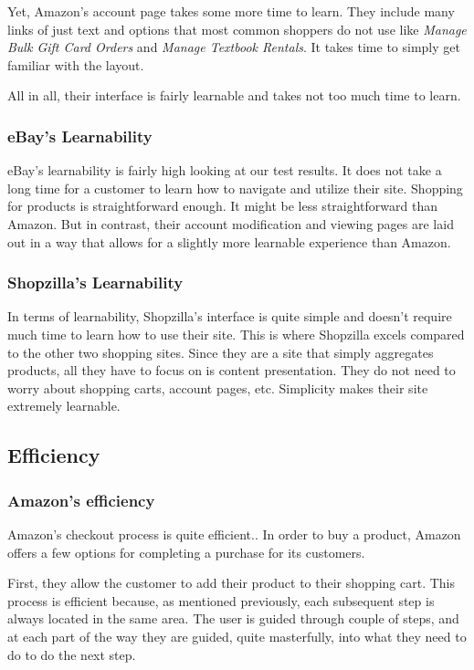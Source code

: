 \documentclass[11pt, oneside]{article}
\begin{document}
		Yet, Amazon's account page takes some more time to learn. They include many links of just text and options that most common shoppers do not use like \textit{Manage Bulk Gift Card Orders} and \textit{Manage Textbook Rentals}. It takes time to simply get familiar with the layout.

		All in all, their interface is fairly learnable and takes not too much time to learn.

		\subsubsection{eBay's Learnability}
		eBay's learnability is fairly high looking at our test results. It does not take a long time for a customer to learn how to navigate and utilize their site. Shopping for products is straightforward enough. It might be less straightforward than Amazon. But in contrast, their account modification and viewing pages are laid out in a way that allows for a slightly more learnable experience than Amazon.

		\subsubsection{Shopzilla's Learnability}
		In terms of learnability, Shopzilla's interface is quite simple and doesn't require much time to learn how to use their site. This is where Shopzilla excels compared to the other two shopping sites. Since they are a site that simply aggregates products, all they have to focus on is content presentation. They do not need to worry about shopping carts, account pages, etc. Simplicity makes their site extremely learnable.

	\subsection{Efficiency}

		\subsubsection{Amazon's efficiency}
		Amazon's checkout process is quite efficient.. In order to buy a product, Amazon offers a few options for completing a purchase for its customers. 

		First, they allow the customer to add their product to their shopping cart. This process is efficient because, as mentioned previously, each subsequent step is always located in the same area. The user is guided through couple of steps, and at each part of the way they are guided, quite masterfully, into what they need to do to do the next step.
\end{document}
